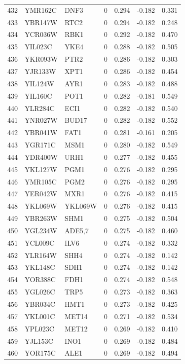 \begin{longtable}{rllrrrr}
432 & YMR162C & DNF3 & 0 & 0.294 & -0.182 & 0.331\\
433 & YBR147W & RTC2 & 0 & 0.294 & -0.182 & 0.248\\
434 & YCR036W & RBK1 & 0 & 0.292 & -0.182 & 0.470\\
435 & YIL023C & YKE4 & 0 & 0.288 & -0.182 & 0.505\\
436 & YKR093W & PTR2 & 0 & 0.286 & -0.182 & 0.303\\
437 & YJR133W & XPT1 & 0 & 0.286 & -0.182 & 0.454\\
438 & YIL124W & AYR1 & 0 & 0.283 & -0.182 & 0.488\\
439 & YIL160C & POT1 & 0 & 0.282 & -0.181 & 0.549\\
440 & YLR284C & ECI1 & 0 & 0.282 & -0.182 & 0.540\\
441 & YNR027W & BUD17 & 0 & 0.282 & -0.182 & 0.552\\
442 & YBR041W & FAT1 & 0 & 0.281 & -0.161 & 0.205\\
443 & YGR171C & MSM1 & 0 & 0.280 & -0.182 & 0.549\\
444 & YDR400W & URH1 & 0 & 0.277 & -0.182 & 0.455\\
445 & YKL127W & PGM1 & 0 & 0.276 & -0.182 & 0.295\\
446 & YMR105C & PGM2 & 0 & 0.276 & -0.182 & 0.295\\
447 & YER042W & MXR1 & 0 & 0.276 & -0.182 & 0.415\\
448 & YKL069W & YKL069W & 0 & 0.276 & -0.182 & 0.415\\
449 & YBR263W & SHM1 & 0 & 0.275 & -0.182 & 0.504\\
450 & YGL234W & ADE5,7 & 0 & 0.275 & -0.182 & 0.460\\
451 & YCL009C & ILV6 & 0 & 0.274 & -0.182 & 0.332\\
452 & YLR164W & SHH4 & 0 & 0.274 & -0.182 & 0.142\\
453 & YKL148C & SDH1 & 0 & 0.274 & -0.182 & 0.142\\
454 & YOR388C & FDH1 & 0 & 0.274 & -0.182 & 0.548\\
455 & YGL026C & TRP5 & 0 & 0.273 & -0.182 & 0.363\\
456 & YBR034C & HMT1 & 0 & 0.273 & -0.182 & 0.425\\
457 & YKL001C & MET14 & 0 & 0.271 & -0.182 & 0.534\\
458 & YPL023C & MET12 & 0 & 0.269 & -0.182 & 0.410\\
459 & YJL153C & INO1 & 0 & 0.269 & -0.182 & 0.484\\
460 & YOR175C & ALE1 & 0 & 0.269 & -0.182 & 0.494\\

\end{longtable}

